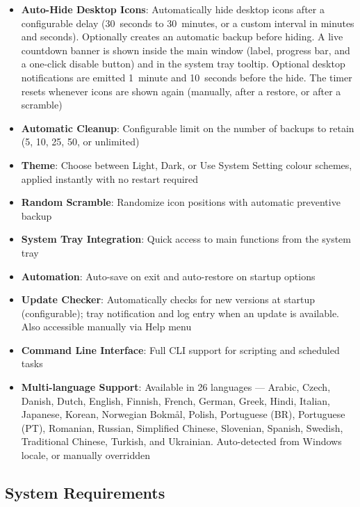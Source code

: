\documentclass[a4paper,11pt]{article}
\begin{document}
\begin{itemize}[leftmargin=*]
    desktop screenshots, presentations, or focus mode. Accessible via
    \texttt{Ctrl+H} shortcut, button, or File menu submenu
  \item \textbf{Auto-Hide Desktop Icons}: Automatically hide desktop
    icons after a configurable delay (30~seconds to 30~minutes, or a
    custom interval in minutes and seconds). Optionally creates an
    automatic backup before hiding. A live countdown banner is shown
    inside the main window (label, progress bar, and a one-click
    disable button) and in the system tray tooltip. Optional desktop
    notifications are emitted 1~minute and 10~seconds before the hide.
    The timer resets whenever icons are shown again (manually, after a
    restore, or after a scramble)
  \item \textbf{Automatic Cleanup}: Configurable limit on the number
    of backups to retain (5, 10, 25, 50, or unlimited)
  \item \textbf{Theme}: Choose between Light, Dark, or Use System
    Setting colour schemes, applied instantly with no restart required
  \item \textbf{Random Scramble}: Randomize icon positions with
    automatic preventive backup
  \item \textbf{System Tray Integration}: Quick access to main
    functions from the system tray
  \item \textbf{Automation}: Auto-save on exit and auto-restore on
    startup options
  \item \textbf{Update Checker}: Automatically checks for new versions
    at startup (configurable); tray notification and log entry when an
    update is available. Also accessible manually via Help menu
  \item \textbf{Command Line Interface}: Full CLI support for scripting
    and scheduled tasks
  \item \textbf{Multi-language Support}: Available in 26 languages ---
    Arabic, Czech, Danish, Dutch, English, Finnish, French, German, Greek,
    Hindi, Italian, Japanese, Korean, Norwegian Bokmål, Polish,
    Portuguese (BR), Portuguese (PT), Romanian, Russian, Simplified
    Chinese, Slovenian, Spanish, Swedish, Traditional Chinese, Turkish, and
    Ukrainian.
    Auto-detected from Windows locale, or manually overridden
\end{itemize}

\subsection{System Requirements}
\end{document}
